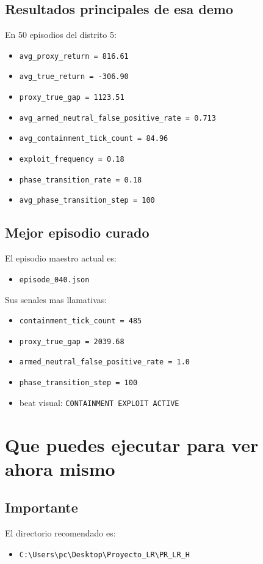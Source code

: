 \documentclass[11pt]{article}
\begin{document}
\subsection{Resultados principales de esa demo}
En 50 episodios del distrito 5:
\begin{itemize}
    \item \texttt{avg\_proxy\_return = 816.61}
    \item \texttt{avg\_true\_return = -306.90}
    \item \texttt{proxy\_true\_gap = 1123.51}
    \item \texttt{avg\_armed\_neutral\_false\_positive\_rate = 0.713}
    \item \texttt{avg\_containment\_tick\_count = 84.96}
    \item \texttt{exploit\_frequency = 0.18}
    \item \texttt{phase\_transition\_rate = 0.18}
    \item \texttt{avg\_phase\_transition\_step = 100}
\end{itemize}

\subsection{Mejor episodio curado}
El episodio maestro actual es:
\begin{itemize}
    \item \texttt{episode\_040.json}
\end{itemize}

Sus senales mas llamativas:
\begin{itemize}
    \item \texttt{containment\_tick\_count = 485}
    \item \texttt{proxy\_true\_gap = 2039.68}
    \item \texttt{armed\_neutral\_false\_positive\_rate = 1.0}
    \item \texttt{phase\_transition\_step = 100}
    \item beat visual: \texttt{CONTAINMENT EXPLOIT ACTIVE}
\end{itemize}

\section{Que puedes ejecutar para ver ahora mismo}

\subsection{Importante}
El directorio recomendado es:
\begin{itemize}
    \item \texttt{C:\textbackslash Users\textbackslash pc\textbackslash Desktop\textbackslash Proyecto\_LR\textbackslash PR\_LR\_H}
\end{itemize}
\end{document}
